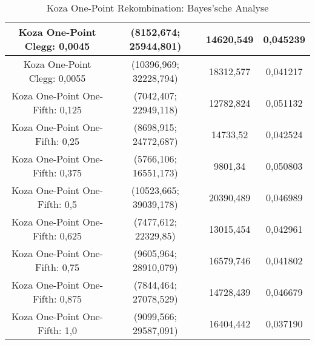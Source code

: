 \begin{table}[H]
\begin{tabular}{c | c | c | c}
		\hline
		Koza One-Point Clegg: 0,0045 & (8152,674; 25944,801) & 14620,549 & 0,045239\\
		\hline
		Koza One-Point Clegg: 0,0055 & (10396,969; 32228,794) & 18312,577 & 0,041217\\
		\hline
		\hline
		Koza One-Point One-Fifth: 0,125 & (7042,407; 22949,118) & 12782,824 & 0,051132\\
		\hline
		Koza One-Point One-Fifth: 0,25 & (8698,915; 24772,687) & 14733,52 & 0,042524\\
		\hline
		Koza One-Point One-Fifth: 0,375 & (\color{Green}5766,106\color{black}; \color{Green}16551,173\color{black}) & \color{Green}9801,34\color{black} & \color{Green}0,050803\color{black} \\
		\hline
		Koza One-Point One-Fifth: 0,5 & (10523,665; 39039,178) & 20390,489 & 0,046989\\
		\hline
		Koza One-Point One-Fifth: 0,625 & (7477,612; 22329,85) & 13015,454 & 0,042961\\
		\hline
		Koza One-Point One-Fifth: 0,75 & (9605,964; 28910,079) & 16579,746 & 0,041802\\
		\hline
		Koza One-Point One-Fifth: 0,875 & (7844,464; 27078,529) & 14728,439 & 0,046679\\
		\hline
		Koza One-Point One-Fifth: 1,0 & (9099,566; 29587,091) & 16404,442 & 0,037190\\
	\end{tabular}
	\caption{Koza One-Point Rekombination: Bayes'sche Analyse}
	\label{table:kozaOnePointBayesian}
\end{table}

